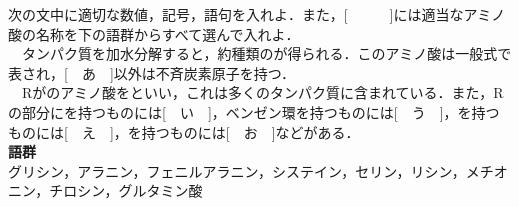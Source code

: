 \documentclass[a4paper,12pt]{ltjsarticle}
\begin{document}
\newpage
\begin{que}
次の文中に適切な数値，記号，語句を入れよ．また，[　　　]には適当なアミノ酸の名称を下の語群からすべて選んで入れよ．\\

　タンパク質を加水分解すると，約種類のが得られる．このアミノ酸は一般式で表され，[　あ　]以外は不斉炭素原子を持つ．\\
　Rがのアミノ酸をといい，これは多くのタンパク質に含まれている．また，Rの部分にを持つものには[　い　]，ベンゼン環を持つものには[　う　]，を持つものには[　え　]，を持つものには[　お　]などがある．\\[5pt]
\textbf{語群}\\
グリシン，アラニン，フェニルアラニン，システイン，セリン，リシン，メチオニン，チロシン，グルタミン酸
\end{que}
\end{document}
